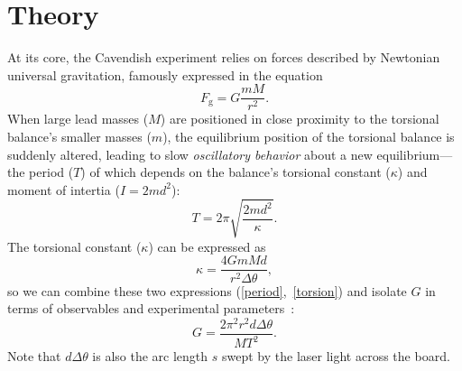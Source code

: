 \documentclass[12pt]{report}
\begin{document}
\section*{Theory}
{
At its core, the Cavendish experiment relies on forces described by Newtonian universal gravitation, famously expressed in the equation
    \begin{equation*}
        F_\mathrm{g} = G \frac{mM}{r^2}.
    \end{equation*} 
When large lead masses (\(M\)) are positioned in close proximity to the torsional balance's smaller masses (\(m\)), the equilibrium position of the torsional balance is suddenly altered, leading to slow \textit{oscillatory behavior} about a new equilibrium—the period (\( T \)) of which depends on the balance's torsional constant (\( \kappa \)) and moment of intertia (\( I = 2md^2 \)):
    \begin{equation}\label{period}
        T = 2\pi \sqrt{\frac{2md^2}{\kappa}}.
    \end{equation}
The torsional constant (\( \kappa \)) can be expressed as 
    \begin{equation}\label{torsion}
        \kappa = \frac{4GmMd}{r^2 \Delta \theta},
    \end{equation}
    so we can combine these two expressions (\ref{period},~\ref{torsion}) and isolate \(G\) in terms of observables and experimental parameters~\cite{BMS2024}:
        \begin{equation}\label{G}
            G = \frac{2\pi^2r^2d\Delta\theta}{MT^2}. 
        \end{equation}
    Note that \( d \Delta \theta \) is also the arc length \( s \) swept by the laser light across the board.


}
\end{document}
